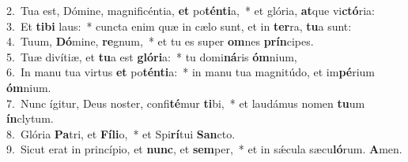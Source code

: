 {2.~}Tua est, Dómine, magnificéntia, \textbf{et} po\textbf{tén}\textbf{ti}a,~* et glória, \textbf{at}que vi\textbf{ctó}ria:\\
{3.~}Et \textbf{ti}\textbf{bi} laus:~* cuncta enim quæ in cælo sunt, et in \textbf{ter}ra, \textbf{tu}a sunt:\\
{4.~}Tuum, \textbf{Dó}mine, \textbf{re}gnum,~* et tu es super \textbf{om}nes \textbf{prín}cipes.\\
{5.~}Tuæ divítiæ, et \textbf{tu}a est \textbf{gló}\textbf{ri}a:~* tu domi\textbf{ná}ris \textbf{óm}nium,\\
{6.~}In manu tua virtus \textbf{et} po\textbf{tén}\textbf{ti}a:~* in manu tua magnitúdo, et im\textbf{pé}rium \textbf{óm}nium.\\
{7.~}Nunc ígitur, Deus noster, confi\textbf{té}mur \textbf{ti}bi,~* et laudámus nomen \textbf{tu}um \textbf{ín}clytum.\\
{8.~}Glória \textbf{Pa}tri, et \textbf{Fí}\textbf{li}o,~* et Spi\textbf{rí}tui \textbf{San}cto.\\
{9.~}Sicut erat in princípio, et \textbf{nunc}, et \textbf{sem}per,~* et in sǽcula sæcu\textbf{ló}rum. \textbf{A}men.\\
